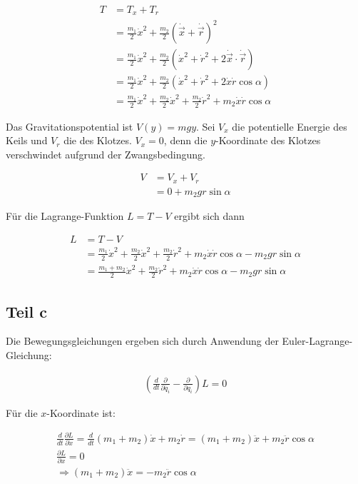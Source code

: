 \documentclass[a4paper,german,12pt,smallheadings]{scrartcl}
\begin{document}
\begin{align*}
  T &= T_x + T_r \\
    &= \frac{m_1}{2}\dot{x}^2 + \frac{m_2}{2} \left(\dot{\vec{x}} + \dot{\vec{r}}\right)^2 \\
    &= \frac{m_1}{2}\dot{x}^2 + \frac{m_2}{2}(\dot{x}^2 + \dot{r}^2 + 2\dot{\vec{x}}\cdot\dot{\vec{r}}) \\
    &= \frac{m_1}{2}\dot{x}^2 + \frac{m_2}{2}(\dot{x}^2 + \dot{r}^2 + 2\dot{x}\dot{r} \cos \alpha) \\
    &= \frac{m_1}{2}\dot{x}^2 + \frac{m_2}{2}\dot{x}^2 + \frac{m_2}{2}\dot{r}^2 + m_2\dot{x}\dot{r} \cos \alpha
\end{align*}

Das Gravitationspotential ist $V(y) = mgy$. Sei $V_x$ die potentielle Energie
des Keils und $V_r$ die des Klotzes. $V_x = 0$, denn die $y$-Koordinate des
Klotzes verschwindet aufgrund der Zwangsbedingung.

\begin{align*}
  V &= V_x + V_r \\
    &= 0 + m_2gr \sin \alpha
\end{align*}

Für die Lagrange-Funktion $L = T - V$ ergibt sich dann

\begin{align*}
  L &= T - V \\
    &= \frac{m_1}{2}\dot{x}^2 + \frac{m_2}{2}\dot{x}^2 + \frac{m_2}{2}\dot{r}^2 + m_2\dot{x}\dot{r} \cos \alpha - m_2gr \sin \alpha \\
    &= \frac{m_1+m_2}{2}\dot{x}^2 + \frac{m_2}{2}\dot{r}^2 + m_2\dot{x}\dot{r} \cos \alpha - m_2gr \sin \alpha
\end{align*}

\subsection*{Teil c}

Die Bewegungsgleichungen ergeben sich durch Anwendung der Euler-Lagrange-Gleichung:

\begin{align*}
  \left(\frac{d}{dt}\frac{\partial}{\partial \dot{q_i}} - \frac{\partial}{\partial q_i}\right) L = 0
\end{align*}

Für die $x$-Koordinate ist:

\begin{align}
  \frac{d}{dt}\frac{\partial L}{\partial \dot{x}} = \frac{d}{dt} (m_1+m_2)\dot{x} + m_2\dot{r} = (m_1+m_2)\ddot{x} + m_2\ddot{r} \cos \alpha \\
  \frac{\partial L}{\partial x} = 0 \\
  \Rightarrow (m_1+m_2)\ddot{x} = -m_2 \ddot{r} \cos \alpha
  \label{x_component}
\end{align}
\end{document}
